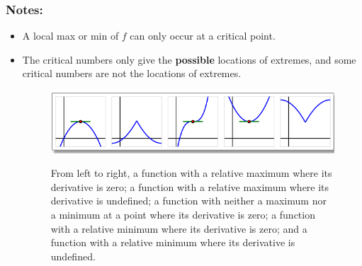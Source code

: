 \subsubsection*{Notes:}
\begin{itemize}
    \item A local max or min of $f$ can only occur at a critical point.
    \item The critical numbers only give the \textbf{possible} locations of extremes, and some critical numbers are not the locations of extremes.
    \begin{figure}[h]
    \centering
    \caption{From left to right, a function with a relative maximum where its derivative is zero; a function with a relative maximum where its derivative is undefined; a function with neither a maximum nor a minimum at a point where its derivative is zero; a function with a relative minimum where its derivative is zero; and a function with a relative minimum where its derivative is undefined.} 
    \includegraphics[scale=2]{images/FirstDerivativeTest/ActiveCalculus3_1_criticalNumbers.PNG} 
    \label{fig:oneLocalExtrema}
\end{figure}
    
\end{itemize}
\newpage

